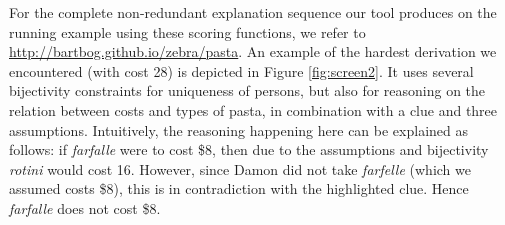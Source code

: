 For the complete non-redundant explanation sequence our tool produces on the running example using these scoring functions, we refer to \url{http://bartbog.github.io/zebra/pasta}. An example of the hardest derivation we encountered (with cost 28) is depicted in Figure \ref{fig:screen2}. It uses several bijectivity constraints for uniqueness of persons, but also for reasoning on the relation between costs and types of pasta, in combination with a clue and three assumptions.
Intuitively, the reasoning happening here can be explained as follows: if \textit{farfalle} were to cost \$8, then due to the assumptions and bijectivity \textit{rotini} would cost 16. However, since Damon did not take \textit{farfelle} (which we assumed costs \$8), this is in contradiction with the highlighted clue. Hence \textit{farfalle} does not cost \$8. 